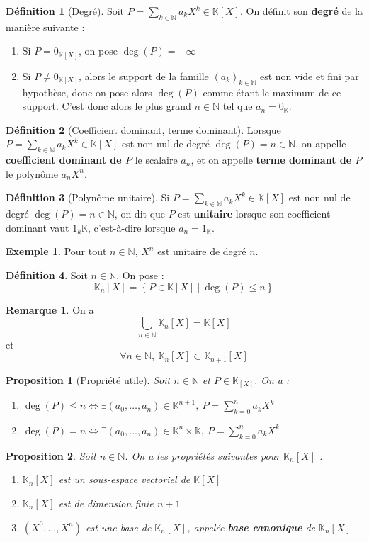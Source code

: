 \documentclass[french]{book}
\newcommand{\N}{\mathbb{N}}
\newcommand{\K}{\mathbb{K}}
\theoremstyle{plain}
\newtheorem{prop}{Proposition}[chapter]
\theoremstyle{definition}
\newtheorem{dfn}{Définition}[chapter]
\newtheorem{exa}{Exemple}[chapter]
\newtheorem{rmq}{Remarque}[chapter]
\theoremstyle{remark}
\begin{document}
\begin{dfn}[Degré]
	Soit $P=\displaystyle\sum_{k\in\N}a_kX^k\in\K[X]$. On définit son \textbf{degré} de la manière suivante :
	\begin{enumerate}
		\item Si $P=0_{\K[X]}$, on pose $\deg(P)=-\infty$
		\item Si $P\ne0_{\K[X]}$, alors le support de la famille $(a_k)_{k\in\N}$ est non vide et fini par hypothèse, donc on pose alors $\deg(P)$ comme étant le maximum de ce support. C'est donc alors le plus grand $n\in\N$ tel que $a_n=0_\K$.
	\end{enumerate} 
\end{dfn}
\begin{dfn}[Coefficient dominant, terme dominant]
	Lorsque $P=\displaystyle\sum_{k\in\N}a_kX^k\in\K[X]$ est non nul de degré $\deg(P)=n\in\N$, on appelle \textbf{coefficient dominant de $P$} le scalaire $a_n$, et on appelle \textbf{terme dominant de $P$} le polynôme $a_nX^n$.
\end{dfn}
\begin{dfn}[Polynôme unitaire]
	Si $P=\displaystyle\sum_{k\in\N}a_kX^k\in\K[X]$ est non nul de degré $\deg(P)=n\in\N$, on dit que $P$ est \textbf{unitaire} lorsque son coefficient dominant vaut $1_k\K$, c'est-à-dire lorsque $a_n=1_\K$.
\end{dfn}
\begin{exa}
	Pour tout $n\in\N$, $X^n$ est unitaire de degré $n$.
\end{exa}
\begin{dfn}
	Soit $n\in\N$. On pose : $$\K_n[X]=\left\{P\in\K[X]\ | \ \deg(P)\leqslant n\right\}$$
\end{dfn}
\begin{rmq}
	On a $$\bigcup_{n\in\N}\K_n[X]=\K[X]$$ et $$\forall n\in\N,\ \K_n[X]\subset\K_{n+1}[X]$$
\end{rmq}
\begin{prop}[Propriété utile]
	Soit $n\in\N$ et $P\in\K_[X]$. On a :
	\begin{enumerate}
		\item $\displaystyle\deg(P)\leqslant n \iff \exists(a_0,\ldots,a_n)\in\K^{n+1}, \ P=\sum_{k=0}^{n}a_kX^k$
		\item $\displaystyle\deg(P)=n \iff \exists(a_0,\ldots,a_n)\in\K^n\times\K,\ P=\sum_{k=0}^{n}a_kX^k$
	\end{enumerate}
\end{prop}
\begin{prop}
	Soit $n\in\N$. On a les propriétés suivantes pour $\K_n[X]$ :
	\begin{enumerate}
		\item $\K_n[X]$ est un sous-espace vectoriel de $\K[X]$
		\item $\K_n[X]$ est de dimension finie $n+1$
		\item $(X^0,\ldots,X^n)$ est une base de $\K_n[X]$, appelée \textbf{base canonique} de $\K_n[X]$
	\end{enumerate}
\end{prop}
\end{document}
